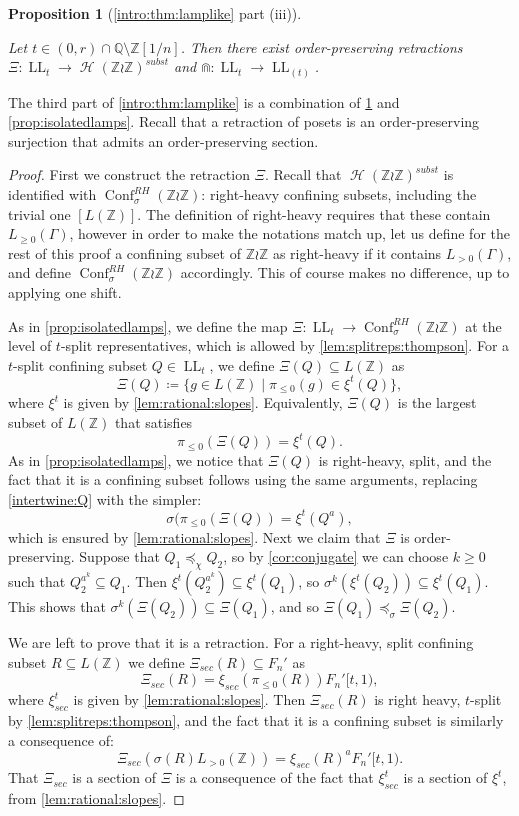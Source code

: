 \documentclass[reqno,12pt]{amsart}\setcounter{tocdepth}{1}
\newtheorem{proposition}[theorem]{Proposition}
\theoremstyle{definition}
\newcommand{\Z}{\mathbb{Z}}
\newcommand{\Q}{\mathbb{Q}}
\DeclareMathOperator{\Hyp}{\mathcal{H}}
\DeclareMathOperator{\Conf}{Conf}
\DeclareMathOperator{\LL}{LL}
\numberwithin{equation}{section}
\begin{document}
\begin{proposition}[\cref{intro:thm:lamplike} part (iii)]
\label{prop:rationallamps}

Let $t \in (0, r) \cap \Q \setminus \Z[1/n]$. Then there exist order-preserving retractions $\Xi \colon \LL_t \to \Hyp(\Z \wr \Z)^{subst}$ and $\Cap \colon \LL_t \to \LL_{(t)}$.
\end{proposition}

The third part of \cref{intro:thm:lamplike} is a combination of \cref{prop:rationallamps} and \cref{prop:isolatedlamps}. Recall that a retraction of posets is an order-preserving surjection that admits an order-preserving section.

\begin{proof}
First we construct the retraction $\Xi$. Recall that $\Hyp(\Z \wr \Z)^{subst}$ is identified with $\Conf_\sigma^{RH}(\Z \wr \Z)$: right-heavy confining subsets, including the trivial one $[L(\Z)]$. The definition of right-heavy requires that these contain $L_{\geq 0}(\Gamma)$, however in order to make the notations match up, let us define for the rest of this proof a confining subset of $\Z \wr \Z$ as right-heavy if it contains $L_{> 0}(\Gamma)$, and define $\Conf_\sigma^{RH}(\Z \wr \Z)$ accordingly. This of course makes no difference, up to applying one shift.

As in \cref{prop:isolatedlamps}, we define the map $\Xi \colon \LL_t \to \Conf_\sigma^{RH}(\Z \wr \Z)$ at the level of $t$-split representatives, which is allowed by \cref{lem:splitreps:thompson}. For a $t$-split confining subset $Q \in \LL_t$, we define $\Xi(Q) \subseteq L(\Z)$ as
\[\Xi(Q) \coloneqq \{ g \in L(\Z) \mid \pi_{\leq 0}(g) \in \xi^t(Q) \},\]
where $\xi^t$ is given by \cref{lem:rational:slopes}. Equivalently, $\Xi(Q)$ is the largest subset of $L(\Z)$ that satisfies
\[\pi_{\leq 0}(\Xi(Q)) = \xi^t(Q).\]
As in \cref{prop:isolatedlamps}, we notice that $\Xi(Q)$ is right-heavy, split, and the fact that it is a confining subset follows using the same arguments, replacing \cref{intertwine:Q} with the simpler:
\[\sigma(\pi_{\leq 0}(\Xi(Q)) = \xi^t(Q^a),\]
which is ensured by \cref{lem:rational:slopes}. Next we claim that $\Xi$ is order-preserving. Suppose that $Q_1\preceq_\chi Q_2$, so by \cref{cor:conjugate} we can choose $k\ge 0$ such that $Q_2^{a^k}\subseteq Q_1$. Then $\xi^t(Q_2^{a^k})\subseteq \xi^t(Q_1)$, so $\sigma^k(\xi^t(Q_2))\subseteq \xi^t(Q_1)$. This shows that $\sigma^k(\Xi(Q_2))\subseteq \Xi(Q_1)$, and so $\Xi(Q_1)\preceq_\sigma \Xi(Q_2)$.

We are left to prove that it is a retraction. For a right-heavy, split confining subset $R \subseteq L(\Z)$ we define $\Xi_{sec}(R) \subseteq F_n'$ as
\[\Xi_{sec}(R) = \xi_{sec}(\pi_{\leq 0}(R)) F_n'[t, 1),\]
where $\xi_{sec}^t$ is given by \cref{lem:rational:slopes}. Then $\Xi_{sec}(R)$ is right heavy, $t$-split by \cref{lem:splitreps:thompson}, and the fact that it is a confining subset is similarly a consequence of:
\[\Xi_{sec}(\sigma(R)L_{>0}(\Z)) = \xi_{sec}(R)^a F_n'[t, 1).\]
That $\Xi_{sec}$ is a section of $\Xi$ is a consequence of the fact that $\xi^t_{sec}$ is a section of $\xi^t$, from \cref{lem:rational:slopes}.


\end{proof}
\end{document}
